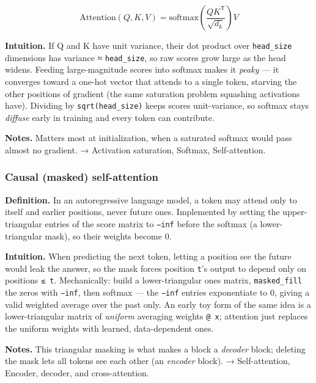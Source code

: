 \documentclass[
  10pt,
  letterpaper,
  onecolumn]{article}
\begin{document}
\begin{equation*}
\mathrm{Attention}(Q,K,V)=\mathrm{softmax}\!\left(\frac{QK^{\mathsf T}}{\sqrt{d_k}}\right)V
\end{equation*}

\textbf{Intuition.} If Q and K have unit variance, their dot product
over \texttt{head\_size} dimensions has variance ≈ \texttt{head\_size},
so raw scores grow large as the head widens. Feeding large-magnitude
scores into softmax makes it \emph{peaky} --- it converges toward a
one-hot vector that attends to a single token, starving the other
positions of gradient (the same saturation problem squashing activations
have). Dividing by \texttt{sqrt(head\_size)} keeps scores unit-variance,
so softmax stays \emph{diffuse} early in training and every token can
contribute.

\textbf{Notes.} Matters most at initialization, when a saturated softmax
would pass almost no gradient. → Activation saturation, Softmax,
Self-attention.

\hypertarget{causal-masked-self-attention}{%
\subsubsection{Causal (masked)
self-attention}\label{causal-masked-self-attention}}

\textbf{Definition.} In an autoregressive language model, a token may
attend only to itself and earlier positions, never future ones.
Implemented by setting the upper-triangular entries of the score matrix
to \texttt{−inf} before the softmax (a lower-triangular mask), so their
weights become 0.

\textbf{Intuition.} When predicting the next token, letting a position
see the future would leak the answer, so the mask forces position
\texttt{t}'s output to depend only on positions \texttt{≤\ t}.
Mechanically: build a lower-triangular ones matrix,
\texttt{masked\_fill} the zeros with \texttt{−inf}, then softmax --- the
\texttt{−inf} entries exponentiate to 0, giving a valid weighted average
over the past only. An early toy form of the same idea is a
lower-triangular matrix of \emph{uniform} averaging weights
\texttt{@\ x}; attention just replaces the uniform weights with learned,
data-dependent ones.

\textbf{Notes.} This triangular masking is what makes a block a
\emph{decoder} block; deleting the mask lets all tokens see each other
(an \emph{encoder} block). → Self-attention, Encoder, decoder, and
cross-attention.
\end{document}
